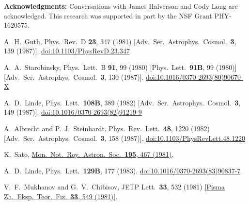 \documentclass[12pt]{article}
\begin{document}
\textbf{Acknowledgments:}
Conversations with James Halverson and Cody Long are acknowledged.
This research was supported in part by the NSF Grant PHY-1620575.

\clearpage

\begin{thebibliography}{99}
  A.~H.~Guth,
  Phys.\ Rev.\ D {\bf 23}, 347 (1981)
  [Adv.\ Ser.\ Astrophys.\ Cosmol.\  {\bf 3}, 139 (1987)].
  \href{https://dx.doi.org/10.1103/PhysRevD.23.347}{doi:10.1103/PhysRevD.23.347}

  A.~A.~Starobinsky,
  Phys.\ Lett.\ B {\bf 91}, 99 (1980)
  [Phys.\ Lett.\  {\bf 91B}, 99 (1980)]
  [Adv.\ Ser.\ Astrophys.\ Cosmol.\  {\bf 3}, 130 (1987)].
  \href{https://dx.doi.org/10.1016/0370-2693(80)90670-X}{doi:10.1016/0370-2693(80)90670-X}

  A.~D.~Linde,
  Phys.\ Lett.\  {\bf 108B}, 389 (1982)
  [Adv.\ Ser.\ Astrophys.\ Cosmol.\  {\bf 3}, 149 (1987)].
  \href{https://dx.doi.org/10.1016/0370-2693(82)91219-9}{doi:10.1016/0370-2693(82)91219-9}

  A.~Albrecht and P.~J.~Steinhardt,
  Phys.\ Rev.\ Lett.\  {\bf 48}, 1220 (1982)
  [Adv.\ Ser.\ Astrophys.\ Cosmol.\  {\bf 3}, 158 (1987)].
  \href{https://dx.doi.org/10.1103/PhysRevLett.48.1220}{doi:10.1103/PhysRevLett.48.1220}

  K.~Sato,
  \href{http://articles.adsabs.harvard.edu/full/1981MNRAS.195..467S}{Mon.\ Not.\ Roy.\ Astron.\ Soc.\  {\bf 195}, 467 (1981)}.

  A.~D.~Linde,
  Phys.\ Lett.\  {\bf 129B}, 177 (1983).
  \href{https://dx.doi.org/10.1016/0370-2693(83)90837-7}{doi:10.1016/0370-2693(83)90837-7}

  V.~F.~Mukhanov and G.~V.~Chibisov,
  JETP Lett.\  {\bf 33}, 532 (1981)
  \href{http://inspirehep.net/record/170051/files/article_23079.pdf?version=1}{[Pisma Zh.\ Eksp.\ Teor.\ Fiz.\  {\bf 33}, 549 (1981)]}.


\end{thebibliography}
\end{document}

